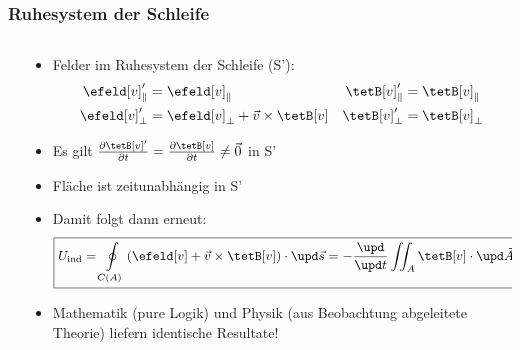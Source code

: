 \begin{frame}
  \frametitle{Ruhesystem der Schleife}
  \begin{columns}
    \begin{column}{.38\textwidth}
  \resizebox{\columnwidth}{!}{}
    \end{column}
    \begin{column}{.62\textwidth}
  \begin{itemize}[<+->]
  \item Felder im Ruhesystem der Schleife (S'):
   \begin{align*}
      \efeld[v]_\parallel' & = \efeld[v]_\parallel & \tetB[v]_\parallel' &= \tetB[v]_\parallel\\
      \efeld[v]_\perp' &= \efeld[v]_\perp + \vec{v} \times \tetB[v] & \tetB[v]_\perp'  & = \tetB[v]_\perp  
      \end{align*}
    \item Es gilt $\frac{\partial \tetB[v]'}{\partial t} = \frac{\partial \tetB[v]}{\partial t} \ne \vec{0}$ in S'
    \item Fläche ist zeitunabhängig in S'
  \item Damit folgt dann \alert{erneut}:
    $$
   \boxed{U_\text{ind} = \oint\displaylimits_{C(A)} \left( \efeld[v] + \vec{v} \times \tetB[v]\right) \cdot\upd\vec{s} = - \frac{\upd}{\upd t}  \iint_{A} \tetB[v] \cdot \upd\vec{A}  = -\dot{\Phi}}
    $$
  \item Mathematik (pure Logik) und Physik (aus Beobachtung abgeleitete Theorie) liefern \alert{identische Resultate}!
    
  \end{itemize}
      \end{column}
    \end{columns}
\end{frame}




   
